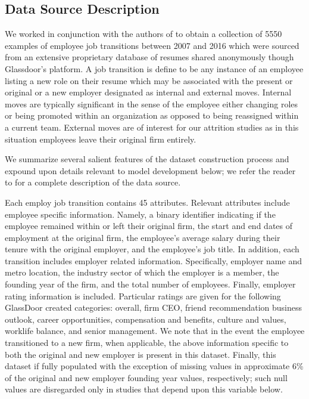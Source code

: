 \documentclass[10pt]{article}
\begin{document}
\subsection{Data Source Description}\label{datdes}

We worked in conjunction with the authors of \cite{Smart2016} to obtain 
a collection of 5550 examples of employee job transitions between 
2007 and 2016 which were sourced from an extensive proprietary database of 
resumes shared anonymously though Glassdoor's platform.  A job transition 
is define to be any instance of an employee listing a new role on their 
resume which may be associated with the present or original or a new employer
designated as internal and external moves.  Internal moves are typically 
significant in the sense of the employee either changing roles or 
being promoted within an organization as opposed to being reassigned 
within a current team. External moves are of interest for our 
attrition studies as in this situation employees leave their original 
firm entirely.

We summarize several salient features of the dataset construction process 
and expound upon details relevant to model development below; we refer the
reader to \cite{Smart2016} for a complete description of the data source. 

Each employ job transition contains 45 attributes.  Relevant attributes 
include employee specific information. Namely, a binary identifier 
indicating if the employee remained within or left their original firm,
the start and end dates of employment at the original firm, the 
employee's average salary during their tenure with the original employer, 
and the employee's job title. 
In addition, each transition includes employer related information. 
Specifically, employer name and metro location, the industry sector of which the employer 
is a member, the founding year of the firm, and the total number of employees. 
Finally, employer rating information is included.  Particular ratings are 
given for the following GlassDoor created categories: overall, firm CEO, friend recommendation 
business outlook, career opportunities, compensation and benefits, culture and values, 
worklife balance, and senior management. 
We note that in the event the employee transitioned to a new firm, when applicable,
the above information specific to both the original and new employer is present in this dataset. 
Finally, this dataset if fully populated with the exception of missing values in 
approximate 6\% of the original and new employer founding year values, respectively;
such null values are disregarded 
only in studies that depend upon this variable below.
\end{document}
